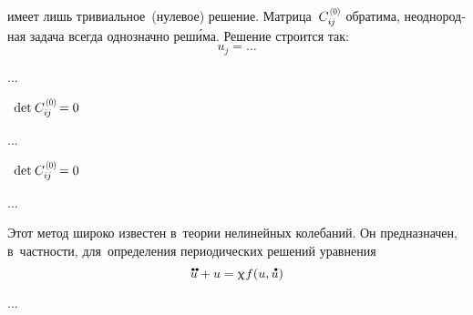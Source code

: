 \begin{otherlanguage}{russian}
\nopagebreak\vspace{-0.5em}\noindent
имеет лишь тривиальное~(нулевое) решение.
Матрица~${C_{i\hspace{-0.1ex}j}^{\hspace{0.2ex}\scalebox{0.66}[0.66]{(0)}}}$ обратима, неоднородная задача всегда однозначно реш\'{и}ма. Решение строится так:
\begin{equation}
u_{j} = \ldots
\end{equation}

...


\indent {}\, ${\operatorname{det} \hspace{.16ex} C_{i\hspace{-0.1ex}j}^{\hspace{0.2ex}\scalebox{0.66}[0.66]{(0)}} \hspace{-0.25ex} = 0}$

...


\indent {}\, ${\operatorname{det} \hspace{.16ex} C_{i\hspace{-0.1ex}j}^{\hspace{0.2ex}\scalebox{0.66}[0.66]{(0)}} \hspace{-0.25ex} = 0}$

...



\end{otherlanguage}




\begin{otherlanguage}{russian}

Этот метод широко известен в~теории нелинейных колебаний.
Он предназначен, в~частности, для~определения периодических решений уравнения
\begin{equation}\label{nonlinearvibrations:famousequation}
\mathdotdotabove{u} + u = \smallparameter \hspace{.1ex} f(u, \mathdotabove{u})
\end{equation}

...



\end{otherlanguage}

